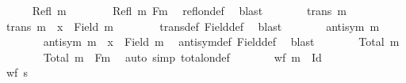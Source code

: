 \begin{isabellebody}
%
\isanewline
\ \ \ \ \isamarkupfalse%
\ {\isachardoublequoteopen}Refl\ {\isacharquery}{\kern0pt}m{\isachardoublequoteclose}\isanewline
\ \ \ \ \ \ \isamarkupfalse%
\ {\isacartoucheopen}Refl\ m{\isacartoucheclose}\ Fm\ \isamarkupfalse%
\ refl{\isacharunderscore}{\kern0pt}on{\isacharunderscore}{\kern0pt}def\ \isamarkupfalse%
\ blast\isanewline
\ \ \ \ \isamarkupfalse%
\ \isamarkupfalse%
\ {\isachardoublequoteopen}trans\ {\isacharquery}{\kern0pt}m{\isachardoublequoteclose}\ \isamarkupfalse%
\ {\isacartoucheopen}trans\ m{\isacartoucheclose}\ \ {\isacartoucheopen}x\ {\isasymnotin}\ Field\ m{\isacartoucheclose}\isanewline
\ \ \ \ \ \ \isamarkupfalse%
\ trans{\isacharunderscore}{\kern0pt}def\ Field{\isacharunderscore}{\kern0pt}def\ \isamarkupfalse%
\ blast\isanewline
\ \ \ \ \isamarkupfalse%
\ \isamarkupfalse%
\ {\isachardoublequoteopen}antisym\ {\isacharquery}{\kern0pt}m{\isachardoublequoteclose}\isanewline
\ \ \ \ \ \ \isamarkupfalse%
\ {\isacartoucheopen}antisym\ m{\isacartoucheclose}\ \ {\isacartoucheopen}x\ {\isasymnotin}\ Field\ m{\isacartoucheclose}\ \isamarkupfalse%
\ antisym{\isacharunderscore}{\kern0pt}def\ Field{\isacharunderscore}{\kern0pt}def\ \isamarkupfalse%
\ blast\isanewline
\ \ \ \ \isamarkupfalse%
\ \isamarkupfalse%
\ {\isachardoublequoteopen}Total\ {\isacharquery}{\kern0pt}m{\isachardoublequoteclose}\isanewline
\ \ \ \ \ \ \isamarkupfalse%
\ {\isacartoucheopen}Total\ m{\isacartoucheclose}\ \ Fm\ \isamarkupfalse%
\ {\isacharparenleft}{\kern0pt}auto\ simp{\isacharcolon}{\kern0pt}\ total{\isacharunderscore}{\kern0pt}on{\isacharunderscore}{\kern0pt}def{\isacharparenright}{\kern0pt}\isanewline
\ \ \ \ \isamarkupfalse%
\ \isamarkupfalse%
\ {\isachardoublequoteopen}wf\ {\isacharparenleft}{\kern0pt}{\isacharquery}{\kern0pt}m\ {\isacharminus}{\kern0pt}\ Id{\isacharparenright}{\kern0pt}{\isachardoublequoteclose}\isanewline
\ \ \ \ \isamarkupfalse%
\ {\isacharminus}{\kern0pt}\isanewline
\ \ \ \ \ \ \isamarkupfalse%
\ {\isachardoublequoteopen}wf\ {\isacharquery}{\kern0pt}s{\isachardoublequoteclose}\isanewline
\ \ \ \ \ \ \ \ \isamarkupfalse%

\end{isabellebody}
